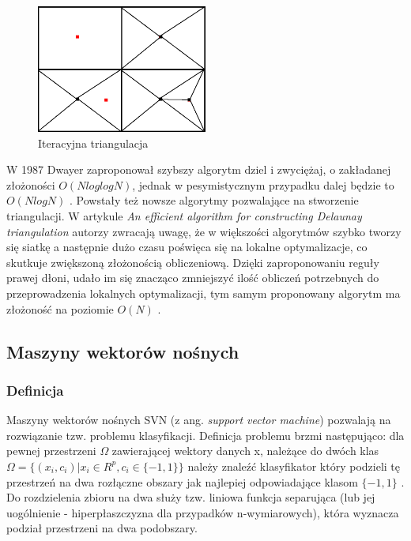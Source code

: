 \begin{figure}[h!]
    \centering
    \includegraphics[width=0.5\textwidth]{img/iter_triangulacja.jpg}
    \caption{Iteracyjna triangulacja}
    \label{fig:iter_triangulacja}
\end{figure}

W 1987 Dwayer zaproponował szybszy algorytm dziel i zwyciężaj, o zakładanej złożoności $O(N log log N)$, jednak w pesymistycznym przypadku dalej będzie to $O(N log N)$  \cite{Dwyer1987}. Powstały też nowsze algorytmy pozwalające na stworzenie triangulacji. W artykule \textsl{An efficient algorithm for constructing Delaunay triangulation} autorzy zwracają uwagę, że w większości algorytmów szybko tworzy się siatkę a następnie dużo czasu poświęca się na lokalne optymalizacje, co skutkuje zwiększoną złożonością obliczeniową. Dzięki zaproponowaniu reguły prawej dłoni, udało im się znacząco zmniejszyć ilość obliczeń potrzebnych do przeprowadzenia lokalnych optymalizacji, tym samym proponowany algorytm ma złożoność na poziomie $O(N)$ \cite{jiang2010}.

\subsection{Maszyny wektorów nośnych}

\subsubsection{Definicja} 

Maszyny wektorów nośnych SVN (z ang. \textit{support vector machine}) pozwalają na rozwiązanie tzw. problemu klasyfikacji. Definicja problemu brzmi następująco: dla pewnej przestrzeni $\Omega$ zawierającej wektory danych x, należące do dwóch klas
$\Omega = \{(x_{i}, c_{i}) | x_{i} \in R^p, c_{i} \in \{-1,1\}\}$
należy znaleźć klasyfikator który podzieli tę przestrzeń na dwa rozłączne obszary jak najlepiej odpowiadające klasom $\{-1, 1\}$ \cite{stefanowski2010}. Do rozdzielenia zbioru na dwa służy tzw. liniowa funkcja separująca (lub jej uogólnienie - hiperpłaszczyzna dla przypadków n-wymiarowych), która wyznacza podział przestrzeni na dwa podobszary.

